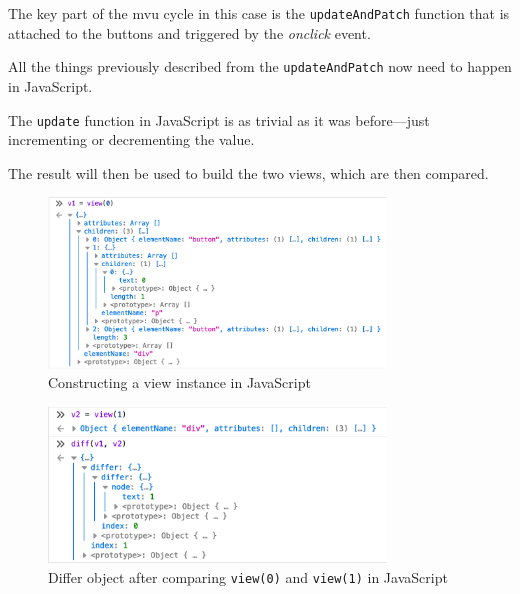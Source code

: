 The key part of the \gls{mvu} cycle in this case is the \texttt{updateAndPatch} function that is attached to the buttons and triggered by the \textit{onclick} event.



All the things previously described from the \texttt{updateAndPatch} now need to happen in JavaScript.

The \texttt{update} function in JavaScript is as trivial as it was before---just incrementing or decrementing the value.



The result will then be used to build the two views, which are then compared.





\begin{figure}
    \centering
    \includegraphics[width=0.8\textwidth]{./images/mvu-js-view}
    \caption{Constructing a view instance in JavaScript}
    \label{fig:view_js}
\end{figure}

\begin{figure}
    \centering
    \includegraphics[width=0.8\textwidth]{./images/mvu-js-diff}
    \caption{Differ object after comparing \texttt{view(0)} and \texttt{view(1)} in JavaScript}
    \label{fig:view_js}
\end{figure}

